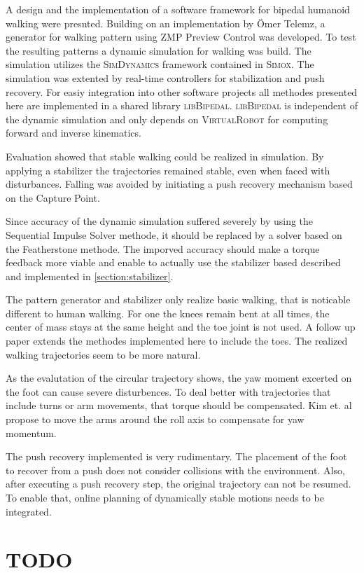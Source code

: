 \documentclass[english,ngerman]{KITreprt}
\newcommand{\name}[1]{\textsc{#1}}
\begin{document}
A design and the implementation of a software framework for bipedal
humanoid walking were presnted. Building on an implementation by Ömer
Telemz, a generator for walking pattern using ZMP Preview Control was
developed. To test the resulting patterns a dynamic simulation for
walking was build. The simulation utilizes the \name{SimDynamics}
framework contained in \name{Simox}. The simulation was extented by
real-time controllers for stabilization and push recovery. For easiy
integration into other software projects all methodes presented here are
implemented in a shared library \name{libBipedal}. \name{libBipedal} is
independent of the dynamic simulation and only depends on
\name{VirtualRobot} for computing forward and inverse kinematics.

Evaluation showed that stable walking could be realized in simulation.
By applying a stabilizer the trajectories remained stable, even when
faced with disturbances. Falling was avoided by initiating a push
recovery mechanism based on the Capture Point.

Since accuracy of the dynamic simulation suffered severely by using the
Sequential Impulse Solver methode, it should be replaced by a solver
based on the Featherstone methode. The imporved accuracy should make a
torque feedback more viable and enable to actually use the stabilizer
based described and implemented in \ref{section:stabilizer}.

The pattern generator and stabilizer only realize basic walking, that is
noticable different to human walking. For one the knees remain bent at
all times, the center of mass stays at the same height and the toe joint
is not used. A follow up paper \cite{kajita2012evaluation} extends the
methodes implemented here to include the toes. The realized walking
trajectories seem to be more natural.

As the evalutation of the circular trajectory shows, the yaw moment
excerted on the foot can cause severe disturbences. To deal better with
trajectories that include turns or arm movements, that torque should be
compensated. Kim et. al \cite{kim2005humanoid} propose to move the arms
around the roll axis to compensate for yaw momentum.

The push recovery implemented is very rudimentary. The placement of the
foot to recover from a push does not consider collisions with the
environment. Also, after executing a push recovery step, the original
trajectory can not be resumed. To enable that, online planning of
dynamically stable motions needs to be integrated.

\chapter{TODO}\label{todo}

\listoftodos




\end{document}
